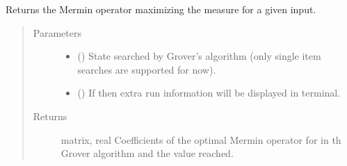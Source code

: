 \documentclass[letterpaper,10pt,english]{sphinxmanual}
\begin{document}
\begin{fulllineitems}
\label{\detokenize{mermin_eval:mermin_eval.mermin_coef_opti}}
Returns the Mermin operator maximizing the measure for a given input.
\begin{quote}\begin{description}
\item[{Parameters}] \leavevmode\begin{itemize}
\item {} 
 (\sphinxstyleliteralemphasis{\sphinxupquote{{[}}}\sphinxstyleliteralemphasis{\sphinxupquote{{]}}}) \textendash{} State searched by Grover’s algorithm (only 
single item searches are supported for now).

\item {} 
 () \textendash{} If  then extra run information will be displayed in 
terminal.

\end{itemize}

\item[{Returns}] \leavevmode
matrix, real \textendash{} Coefficients of the optimal Mermin operator for 
 in th Grover algorithm and the value reached.

\end{description}\end{quote}

\end{fulllineitems}

\end{document}
